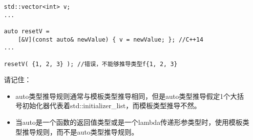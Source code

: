 \begin{lstlisting}
std::vector<int> v;
...

auto resetV = 
	[&V](const auto& newValue) { v = newValue; }; //C++14
...

resetV( {1, 2, 3} ); //错误，不能够推导类型f{1, 2, 3}
\end{lstlisting}

\begin{mdframed}
请记住：
\begin{itemize}
\item{auto类型推导规则通常与模板类型推导相同，但是auto类型推导假定1个大括号初始化器代表着std::initializer\_list，而模板类型推导不然。}
\item{当auto是一个函数的返回值类型或是一个lambda传递形参类型时，使用模板类型推导规则，而不是auto类型推导规则。} 
\end{itemize}
\end{mdframed}
